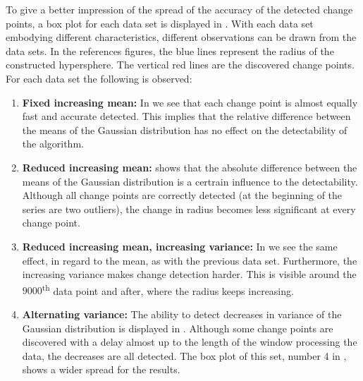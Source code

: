 To give a better impression of the spread of the accuracy of the detected change points, a box plot for each data set is displayed in .
With each data set embodying different characteristics, different observations can be drawn from the data sets.
In the references figures, the blue lines represent the radius of the constructed hypersphere.
The vertical red lines are the discovered change points.
For each data set the following is observed:
\begin{enumerate}
  \item \textbf{Fixed increasing mean:} In  we see that each change point is almost equally fast and accurate detected.
  This implies that the relative difference between the means of the Gaussian distribution has no effect on the detectability of the algorithm.
  \item \textbf{Reduced increasing mean:}  shows that the absolute difference between the means of the Gaussian distribution is a certrain influence to the detectability.
  Although all change points are correctly detected (at the beginning of the series are two outliers), the change in radius becomes less significant at every change point.
  \item \textbf{Reduced increasing mean, increasing variance:} In  we see the same effect, in regard to the mean, as with the previous data set.
  Furthermore, the increasing variance makes change detection harder.
  This is visible around the $9000$\textsuperscript{th} data point and after, where the radius keeps increasing.
  \item \textbf{Alternating variance:} The ability to detect decreases in variance of the Gaussian distribution is displayed in .
  Although some change points are discovered with a delay almost up to the length of the window processing the data, the decreases are all detected.
  The box plot of this set, number 4 in , shows a wider spread for the results.
\end{enumerate}


